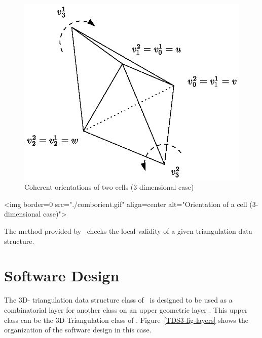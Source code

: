 \begin{ccTexOnly}
\begin{figure}[htbp]

\begin{center} 
\includegraphics{comborient.eps} 
\end{center}
\caption{Coherent orientations of two cells (3-dimensional case)
\label{TDS3-fig-comborient}} 
\end{figure} 
\end{ccTexOnly}

\begin{ccHtmlOnly}
<img border=0 src="./comborient.gif" align=center alt="Orientation of a cell (3-dimensional case)">
\end{ccHtmlOnly}

The  method provided by \cgal\ checks the local
validity of a given triangulation data structure.
 
\section{Software Design}
\label{TDS3-sec-design}

The 3D- triangulation data structure class of \cgal\ is designed to be
used as a combinatorial layer for another class on an upper geometric
layer \cite{k-ddsps-98}. This upper class can be the 3D-Triangulation class of
\cgal. Figure~\ref{TDS3-fig-layers} shows the organization of the
software design in this case.


